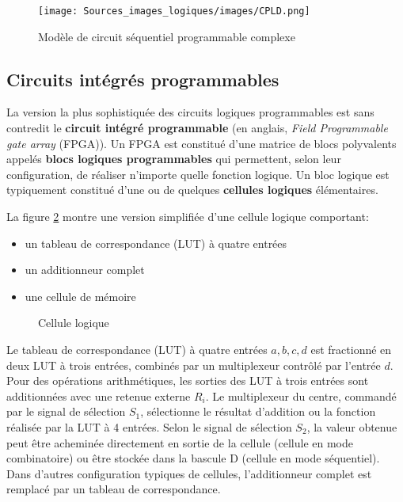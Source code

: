 \documentclass[11pt]{article}
\begin{document}
\begin{figure}[htbp]
\centering
\texttt{[image: Sources\_images\_logiques/images/CPLD.png]}
\caption{\label{fig:org984f76d}Modèle de circuit séquentiel programmable complexe}
\end{figure}

\subsection{Circuits intégrés programmables}
\label{sec:orga44258d}

La version la plus sophistiquée des circuits logiques programmables
est sans contredit le \textbf{circuit intégré programmable} (en anglais, \emph{Field
Programmable gate array} (FPGA)). Un FPGA est constitué d'une matrice
de blocs polyvalents appelés \textbf{blocs logiques programmables} qui
permettent, selon leur configuration, de réaliser n'importe quelle
fonction logique. Un bloc logique est typiquement constitué d'une ou
de quelques \textbf{cellules logiques} élémentaires.

La figure \ref{fig:org4a39afc} montre une version simplifiée d'une cellule
logique comportant:
\begin{itemize}
\item un tableau de correspondance (LUT) à quatre entrées
\item un additionneur complet
\item une cellule de mémoire
\end{itemize}

\begin{figure}[htbp]
\centering

\caption{\label{fig:org4a39afc}Cellule logique}
\end{figure}

Le tableau de correspondance (LUT) à quatre entrées \(a, b, c, d\) est
fractionné en deux LUT à trois entrées, combinés par un multiplexeur
contrôlé par l'entrée \(d\). Pour des opérations arithmétiques, les
sorties des LUT à trois entrées sont additionnées avec une retenue
externe \(R_i\). Le multiplexeur du centre, commandé par le signal de
sélection \(S_1\), sélectionne le résultat d'addition ou la fonction
réalisée par la LUT à 4 entrées. Selon le signal de sélection \(S_2\),
la valeur obtenue peut être acheminée directement en sortie de la
cellule (cellule en mode combinatoire) ou être stockée dans la bascule
D (cellule en mode séquentiel). Dans d'autres configuration typiques
de cellules, l'additionneur complet est remplacé par un tableau de
correspondance.
\end{document}
